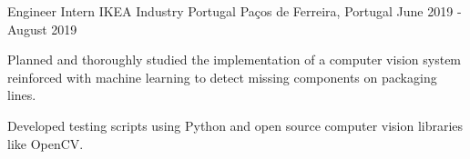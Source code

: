 \begin{cventries}
  \cventry
    {Engineer Intern} %
    {IKEA Industry Portugal} %
    {Paços de Ferreira, Portugal} %
    {June 2019 - August 2019} %
    {
      \begin{cvitems} %
        \item {Planned and thoroughly studied the implementation of a computer vision system reinforced with machine learning to detect missing components on packaging lines.}
        \item {Developed testing scripts using Python and open source computer vision libraries like OpenCV.}
      \end{cvitems}
    }
   
\end{cventries}
